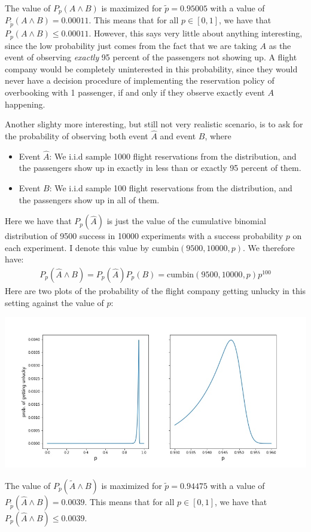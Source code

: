 The value of $P_p(A \land B)$ is maximized for $\tilde{p}=0.95005$ with a value of $P_{\tilde{p}}(A \land B)=0.00011$. This means that for all $p \in [0,1]$, we have that $P_p(A \land B) \leq 0.00011$. However, this says very little about anything interesting, since the low probability just comes from the fact that we are taking $A$ as the event of observing \textit{exactly} 95 percent of the passengers not showing up. A flight company would be completely uninterested in this probability, since they would never have a decision procedure of implementing the reservation policy of overbooking with 1 passenger, if and only if they observe exactly event $A$ happening. 

Another slighty more interesting, but still not very realistic scenario, is to ask for the probability of observing both event $\hat{A}$ and event $B$, where
\begin{itemize}
\item Event $\hat{A}$: We i.i.d sample 1000 flight reservations from the distribution, and the passengers show up in exactly in less than or exactly 95 percent of them.
\item Event $B$: We i.i.d sample 100 flight reservations from the distribution, and the passengers show up in all of them.
\end{itemize}
Here we have that $P_p(\hat{A})$ is just the value of the cumulative binomial distribution of 9500 success in 10000 experiments with a success probability $p$ on each experiment. I denote this value by $\text{cumbin}(9500, 10000,p)$. We therefore have:
\begin{align}
P_p(\hat{A} \land B) = P_p(\hat{A})P_p(B) = \text{cumbin}(9500, 10000,p) p^{100}
\end{align}
Here are two plots of the probability of the flight company getting unlucky in this setting against the value of $p$:
\begin{center}
\includegraphics[scale=0.5]{airline_revisited/fig2.jpg}
\end{center}
The value of $P_p(\tilde{A} \land B)$ is maximized for $\tilde{p}=0.94475$ with a value of $P_{\tilde{p}}(\hat{A} \land B)=0.0039$. This means that for all $p \in [0,1]$, we have that $P_p(\hat{A} \land B) \leq 0.0039$.
